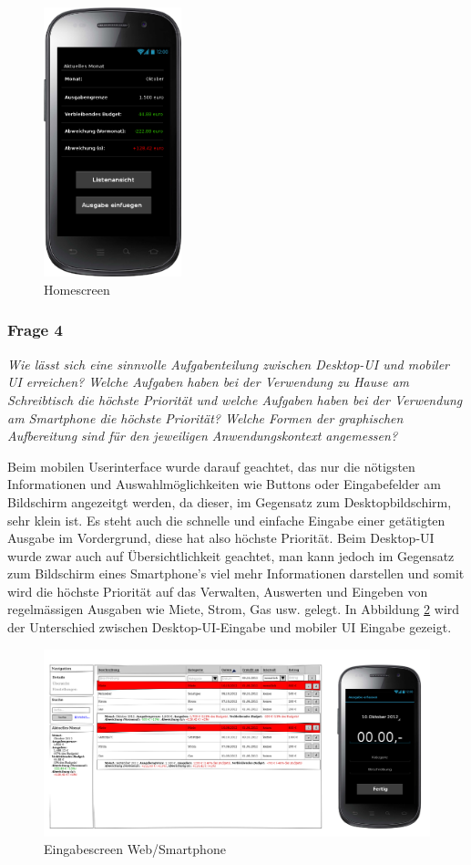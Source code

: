 \begin{figure}[htl]
\centering
\includegraphics[width=4cm]{img/smartphone_homescreen}
\caption{Homescreen}
\label{fig:smartphone_homescreen}
\end{figure}

\subsubsection{Frage 4}

\emph{Wie lässt sich eine sinnvolle Aufgabenteilung zwischen Desktop-UI und mobiler UI erreichen?
Welche Aufgaben haben bei der Verwendung zu Hause am Schreibtisch die höchste Priorität und welche
Aufgaben haben bei der Verwendung am Smartphone die höchste Priorität? Welche Formen der graphischen
Aufbereitung sind für den jeweiligen Anwendungskontext angemessen?}

\vspace{2mm}

Beim mobilen Userinterface wurde darauf geachtet, das nur die n\"otigsten Informationen und
Auswahlm\"oglichkeiten wie Buttons oder Eingabefelder am Bildschirm angezeitgt werden, da dieser,
im Gegensatz zum Desktopbildschirm, sehr klein ist. Es steht auch die schnelle und einfache
Eingabe einer get\"atigten Ausgabe im Vordergrund, diese hat also h\"ochste Priorit\"at.
Beim Desktop-UI wurde zwar auch auf \"Ubersichtlichkeit geachtet, man kann jedoch im Gegensatz
zum Bildschirm eines Smartphone's viel mehr Informationen darstellen und somit wird die h\"ochste
Priorit\"at auf das Verwalten, Auswerten und Eingeben von regelm\"assigen Ausgaben wie Miete, Strom,
Gas usw. gelegt. In Abbildung \ref{fig:smartphone_web_comparison} wird der Unterschied zwischen Desktop-UI-Eingabe und mobiler UI Eingabe gezeigt.

\begin{figure}[htl]
\centering
\includegraphics[width=\textwidth]{img/smartphone_web_comparison}
\caption{Eingabescreen Web/Smartphone}
\label{fig:smartphone_web_comparison}
\end{figure}
